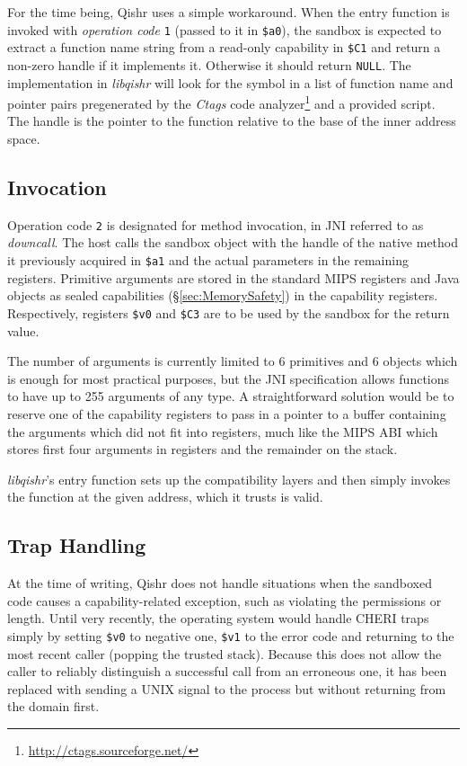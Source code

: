 \documentclass[a4paper,12pt,twoside,openright]{report}
\newcommand{\reg}[1]{\texttt{\$#1}}
\newcommand{\tool}[1]{\emph{#1}}
\newcommand{\lib}[1]{\tool{lib#1}}
\begin{document}
For the time being, Qishr uses a simple workaround. When the entry function is invoked with \emph{operation code} \texttt{1} (passed to it in \reg{a0}), the sandbox is expected to extract a function name string from a read-only capability in \reg{C1} and return a non-zero handle if it implements it. Otherwise it should return \texttt{NULL}. The implementation in \lib{qishr} will look for the symbol in a list of function name and pointer pairs pregenerated by the \tool{Ctags} code analyzer\footnote{\url{http://ctags.sourceforge.net/}} and a provided script. The handle is the pointer to the function relative to the base of the inner address space.

\subsection{Invocation}

Operation code \texttt{2} is designated for method invocation, in JNI referred to as \emph{downcall}. The host calls the sandbox object with the handle of the native method it previously acquired in \reg{a1} and the actual parameters in the remaining registers. Primitive arguments are stored in the standard MIPS registers and Java objects as sealed capabilities (\S\ref{sec:MemorySafety}) in the capability registers. Respectively, registers \reg{v0} and \reg{C3} are to be used by the sandbox for the return value.

The number of arguments is currently limited to 6 primitives and 6 objects which is enough for most practical purposes, but the JNI specification allows functions to have up to 255 arguments of any type. A straightforward solution would be to reserve one of the capability registers to pass in a pointer to a buffer containing the arguments which did not fit into registers, much like the MIPS ABI which stores first four arguments in registers and the remainder on the stack.

\lib{qishr}'s entry function sets up the compatibility layers and then simply invokes the function at the given address, which it trusts is valid. 

\subsection{Trap Handling}

At the time of writing, Qishr does not handle situations when the sandboxed code causes a capability-related exception, such as violating the permissions or length. Until very recently, the operating system would handle CHERI traps simply by setting \reg{v0} to negative one, \reg{v1} to the error code and returning to the most recent caller (popping the trusted stack). Because this does not allow the caller to reliably distinguish a successful call from an erroneous one, it has been replaced with sending a UNIX signal to the process but without returning from the domain first.
\end{document}
